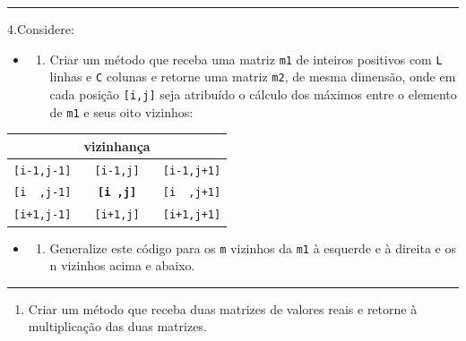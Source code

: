 \documentclass[12pt,a4paper]{article}
\renewcommand{\linethickness}{0.05em}
\providecommand{\tightlist}{%
      \setlength{\itemsep}{0pt}\setlength{\parskip}{0pt}}
\begin{document}
    \begin{center}\rule{0.5\linewidth}{\linethickness}\end{center}

4.Considere:

\begin{itemize}
\item
  \begin{enumerate}
  \def\labelenumi{\alph{enumi})}
  \tightlist
  \item
    Criar um método que receba uma matriz \texttt{m1} de inteiros
    positivos com \texttt{L} linhas e \texttt{C} colunas e retorne uma
    matriz \texttt{m2}, de mesma dimensão, onde em cada posição
    \texttt{{[}i,j{]}} seja atribuído o cálculo dos máximos entre o
    elemento de \texttt{m1} e seus oito vizinhos:
  \end{enumerate}
\end{itemize}

\begin{longtable}[]{@{}ccc@{}}
\toprule
& vizinhança &\tabularnewline
\midrule
\endhead
\texttt{{[}i-1,j-1{]}} & \texttt{{[}i-1,j{]}} &
\texttt{{[}i-1,j+1{]}}\tabularnewline
\texttt{{[}i\ \ ,j-1{]}} & \textbf{\texttt{{[}i\ ,j{]}}} &
\texttt{{[}i\ \ ,j+1{]}}\tabularnewline
\texttt{{[}i+1,j-1{]}} & \texttt{{[}i+1,j{]}} &
\texttt{{[}i+1,j+1{]}}\tabularnewline
\bottomrule
\end{longtable}

\begin{itemize}
\item
  \begin{enumerate}
  \def\labelenumi{\alph{enumi})}
  \setcounter{enumi}{1}
  \tightlist
  \item
    Generalize este código para os \texttt{m} vizinhos da \texttt{m1} à
    esquerde e à direita e os n vizinhos acima e abaixo.
  \end{enumerate}
\end{itemize}

    \begin{center}\rule{0.5\linewidth}{\linethickness}\end{center}

\begin{enumerate}
\def\labelenumi{\arabic{enumi}.}
\setcounter{enumi}{4}
\tightlist
\item
  Criar um método que receba duas matrizes de valores reais e retorne à
  multiplicação das duas matrizes.
\end{enumerate}
\end{document}
